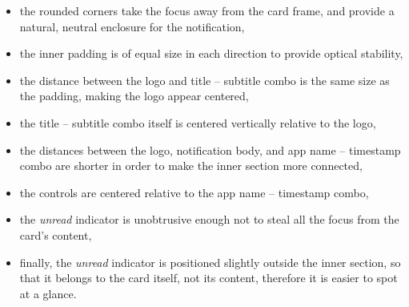 \begin{itemize}
      \item
            the rounded corners take the focus away from the card frame,
            and provide a natural, neutral enclosure for the notification,
      \item
            the inner padding is of equal size in each direction
            to provide optical stability,
      \item
            the distance between the logo and title -- subtitle combo
            is the same size as the padding,
            making the logo appear centered,
      \item
            the title -- subtitle combo itself
            is centered vertically relative to the logo,
      \item
            the distances between the logo,
            notification body, and app name -- timestamp combo are shorter
            in order to make the inner section more connected,
      \item
            the controls are centered relative to the app name -- timestamp combo,
      \item
            the \textit{unread} indicator is unobtrusive enough
            not to steal all the focus from the card's content,
      \item
            finally, the \textit{unread} indicator
            is positioned slightly outside the inner section,
            so that it belongs to the card itself,
            not its content,
            therefore it is easier to spot at a glance.
\end{itemize}

